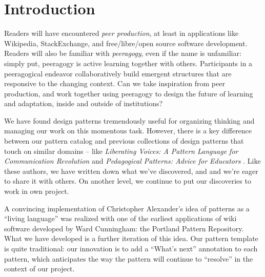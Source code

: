 
\section{Introduction}\label{sec:Introduction}

Readers will have encountered \emph{peer production}, at least in applications like Wikipedia, StackExchange, and free/libre/open source software development.   
%
Readers will also be familiar with \emph{peeragogy}, even if the name is unfamiliar: simply put, peeragogy is active learning together with others.  Participants in a peeragogical endeavor collaboratively build emergent  structures that are responsive to the changing context.
%
Can we take inspiration from peer production, and work together using peeragogy to design the future of learning and adaptation, inside and outside of institutions?



We have found design patterns tremendously useful for organizing thinking and managing our work on this momentous task.  However, there is a key difference between our pattern catalog and previous collections of design patterns that touch on similar domains -- like \emph{Liberating Voices: A Pattern Language for Communication Revolution} \cite{schuler2008liberating} and \emph{Pedagogical Patterns: Advice for Educators} \cite{bergin2012pedagogical}.
%
Like these authors, we have written down what we've discovered, and and we're eager to share it with others.  On another level, we continue to put our discoveries to work in own project.



A convincing implementation of Christopher Alexander’s idea of patterns as a ``living language'' \cite[p.~xvii]{alexander1977pattern} was realized with one of the earliest applications of wiki software developed by Ward Cunningham: the Portland Pattern Repository.  What we have developed is a further iteration of this idea.   Our pattern template is quite traditional: our innovation is to add a ``What's next'' annotation to each pattern, which anticipates the way the pattern will continue to ``resolve'' in the context of our project. 


